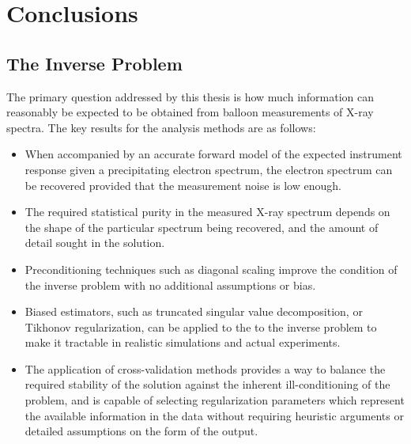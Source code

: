 \chapter{Conclusions}

\section{The Inverse Problem}

The primary question addressed by this thesis is how much information can reasonably be expected to be obtained from balloon measurements of X-ray spectra. The key results for the analysis methods are as follows:

\begin{itemize}
\item When accompanied by an accurate forward model of the expected instrument response given a precipitating electron spectrum, the electron spectrum can be recovered provided that the measurement noise is low enough. 
\item The required statistical purity in the measured X-ray spectrum depends on the shape of the particular spectrum being recovered, and the amount of detail sought in the solution.
\item Preconditioning techniques such as diagonal scaling improve the condition of the inverse problem with no additional assumptions or bias.
\item Biased estimators, such as truncated singular value decomposition, or Tikhonov regularization, can be applied to the to the inverse problem to make it tractable in realistic simulations and actual experiments. 
\item The application of cross-validation methods provides a way to balance the required stability of the solution against the inherent ill-conditioning of the problem, and is capable of selecting regularization parameters which represent the available information in the data without requiring heuristic arguments or detailed assumptions on the form of the output. 
\end{itemize}

